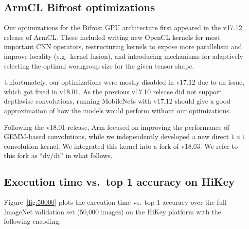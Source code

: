 \documentclass[sigplan]{acmart}
\begin{document}
\subsection{ArmCL Bifrost optimizations}

Our optimizations for the Bifrost GPU architecture first appeared in the v17.12
release of ArmCL.
%
These included writing new OpenCL kernels for most important CNN operators,
restructuring kernels to expose more parallelism and improve locality (e.g.\
kernel fusion), and introducing mechanisms for adaptively selecting the optimal
workgroup size for the given tensor shape.

Unfortunately, our optimizations were mostly disabled in v17.12 due to an issue,
which got fixed in v18.01.
%
As the previous v17.10 release did not support depthwise convolutions, running
MobileNets with v17.12 should give a good approximation of how the models would
perform without our optimizations.

Following the v18.01 release, Arm focused on improving the performance of
GEMM-based convolutions, while we independently developed a new direct $1
\times 1$ convolution kernel. 
%
We integrated this kernel into a fork of v18.03.
%
We refer to this fork as ``dv/dt'' in what follows.

\subsection{Execution time vs.\ top 1 accuracy on HiKey}

Figure~\ref{fig:50000} plots the execution time vs.\ top 1 accuracy over the
full ImageNet validation set (50,000 images) on the HiKey platform with the
following encoding:

\end{document}
